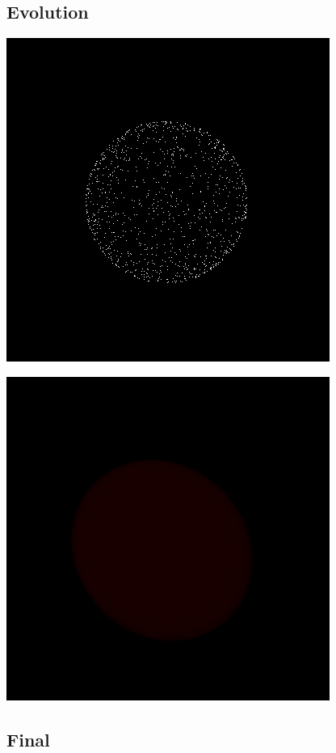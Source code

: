 \documentclass[a4paper]{article}
\begin{document}
\subsection{Evolution}
\begin{center}
	\includegraphics[scale=1.00]{images/gallery/photon_projection.png}
	\label{fig:photon_projection}
\end{center}

\begin{center}
	\includegraphics[scale=1.00]{images/gallery/ray_casting.png}
	\label{fig:ray_projection}
\end{center}


\subsection{Final}
\end{document}
